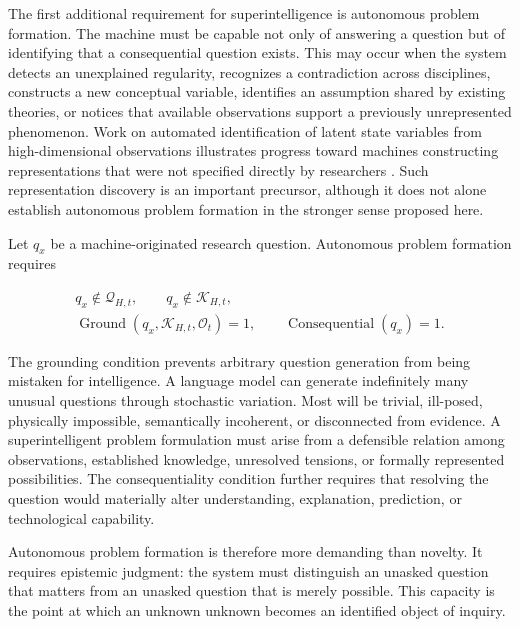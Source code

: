 The first additional requirement for superintelligence is autonomous problem
formation. The machine must be capable not only of answering a question but of
identifying that a consequential question exists. This may occur when the
system detects an unexplained regularity, recognizes a contradiction across
disciplines, constructs a new conceptual variable, identifies an assumption
shared by existing theories, or notices that available observations support a
previously unrepresented phenomenon. Work on automated identification of
latent state variables from high-dimensional observations illustrates progress
toward machines constructing representations that were not specified directly
by researchers \cite{chen2022variables}. Such representation discovery is an
important precursor, although it does not alone establish autonomous problem
formation in the stronger sense proposed here.

Let $q_{x}$ be a machine-originated research question. Autonomous problem
formation requires

\begin{equation}
\begin{aligned}
q_x \notin \mathcal{Q}_{H,t},
\qquad
q_x \notin \mathcal{K}_{H,t},\\
\operatorname{Ground}(q_x,\mathcal{K}_{H,t},\mathcal{O}_{t})=1,
\qquad
\operatorname{Consequential}(q_x)=1.
\end{aligned}
\label{eq:problem_formation}
\end{equation}

The grounding condition prevents arbitrary question generation from being
mistaken for intelligence. A language model can generate indefinitely many
unusual questions through stochastic variation. Most will be trivial,
ill-posed, physically impossible, semantically incoherent, or disconnected
from evidence. A superintelligent problem formulation must arise from a
defensible relation among observations, established knowledge, unresolved
tensions, or formally represented possibilities. The consequentiality
condition further requires that resolving the question would materially alter
understanding, explanation, prediction, or technological capability.

Autonomous problem formation is therefore more demanding than novelty. It
requires epistemic judgment: the system must distinguish an unasked question
that matters from an unasked question that is merely possible. This capacity
is the point at which an unknown unknown becomes an identified object of
inquiry.

